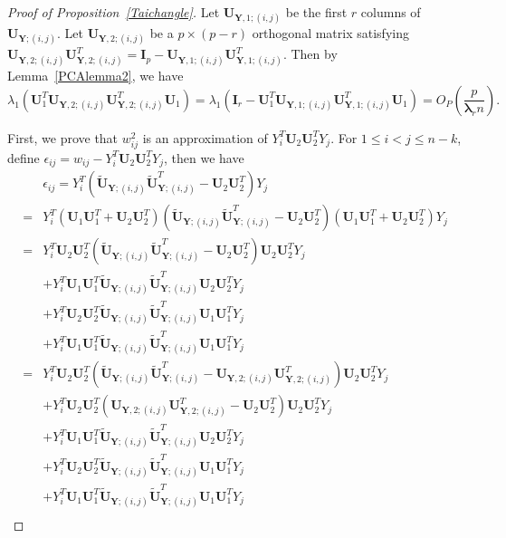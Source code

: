 \documentclass[12pt]{article} %
\newcommand{\bY}{\mathbf{Y}}
\newcommand{\bI}{\mathbf{I}}
\newcommand{\bU}{\mathbf{U}}
\newcommand{\bfsym}[1]{\ensuremath{\boldsymbol{#1}}}
\def\blambda {\bfsym {\lambda}}
\theoremstyle{definition}
\begin{document}
\begin{appendices}
    \begin{proof}[Proof of Proposition~\ref{Taichangle}]
        Let $\bU_{\bY,1;(i,j)}$ be the first $r$ columns of $\bU_{\bY;(i,j)}$.
        Let $\bU_{\bY,2;(i,j)}$ be a $p\times (p-r)$ orthogonal matrix satisfying $\bU_{\bY,2;(i,j)}\bU_{\bY,2;(i,j)}^T= \bI_p-\bU_{\bY,1;(i,j)}\bU_{\bY,1;(i,j)}^T$.
        Then by Lemma~\ref{PCAlemma2}, we have
        $$
        \lambda_1(\bU_1^T \bU_{\bY,2;(i,j)}\bU_{\bY,2;(i,j)}^T \bU_1)
        =
        \lambda_1(\bI_r-\bU_1^T \bU_{\bY,1;(i,j)}\bU_{\bY,1;(i,j)}^T \bU_1)
        =
        O_P(\frac{p}{\blambda_r n}).
        $$


        First, we prove that $w_{ij}^2$ is an approximation of $Y_i^T \bU_2 \bU_2^T Y_j$.
        For $1\leq i<j\leq n-k$, define $\epsilon_{ij}= w_{ij}-Y_i^T \bU_{2} \bU_{2}^T Y_j$, then we have
        \begin{equation}\label{emLong}
    \begin{aligned}
        &\epsilon_{ij}
        =Y_i^T (\tilde{\bU}_{\bY;(i,j)} \tilde{\bU}_{\bY;(i,j)}^T-\bU_2 \bU_2^T) Y_j\\
        =&Y_i^T(\bU_1 \bU_1^T+\bU_2 \bU_2^T) (\tilde{\bU}_{\bY;(i,j)} \tilde{\bU}_{\bY;(i,j)}^T-\bU_2 \bU_2^T)(\bU_1 \bU_1^T+\bU_2 \bU_2^T) Y_j\\
        =&Y_i^T \bU_2 \bU_2^T (\tilde{\bU}_{\bY;(i,j)} \tilde{\bU}_{\bY;(i,j)}^T-\bU_2\bU_2^T) \bU_2 \bU_2^T Y_j\\
        &+Y_i^T \bU_1 \bU_1^T \tilde{\bU}_{\bY;(i,j)} \tilde{\bU}_{\bY;(i,j)}^T \bU_2 \bU_2^T Y_j\\
        &+Y_i^T \bU_2 \bU_2^T \tilde{\bU}_{\bY;(i,j)} \tilde{\bU}_{\bY;(i,j)}^T \bU_1 \bU_1^T Y_j\\
        &+Y_i^T \bU_1 \bU_1^T \tilde{\bU}_{\bY;(i,j)} \tilde{\bU}_{\bY;(i,j)}^T \bU_1 \bU_1^T Y_j\\
        =&
            Y_i^T\bU_2 \bU_2^T ( \tilde{\bU}_{\bY;(i,j)} \tilde{\bU}_{\bY;(i,j)}^T-\bU_{\bY,2;(i,j)} \bU_{\bY,2;(i,j)}^T)\bU_2 \bU_2^T Y_j\\
            &+
            Y_i^T \bU_2 \bU_2^T(\bU_{\bY,2;(i,j)} \bU_{\bY,2;(i,j)}^T-\bU_2 \bU_2^T)\bU_2 \bU_2^T Y_j\\
        &+Y_i^T \bU_1 \bU_1^T \tilde{\bU}_{\bY;(i,j)} \tilde{\bU}_{\bY;(i,j)}^T \bU_2 \bU_2^T Y_j\\
        &+Y_i^T \bU_2 \bU_2^T \tilde{\bU}_{\bY;(i,j)} \tilde{\bU}_{\bY;(i,j)}^T \bU_1 \bU_1^T Y_j\\
        &+Y_i^T \bU_1 \bU_1^T \tilde{\bU}_{\bY;(i,j)} \tilde{\bU}_{\bY;(i,j)}^T \bU_1 \bU_1^T Y_j\\

\end{aligned}
\end{equation}
\end{proof}
\end{appendices}
\end{document}
